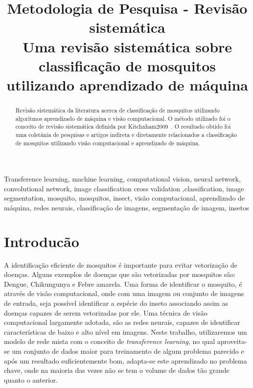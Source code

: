 \documentclass[conference]{IEEEtran}
\begin{document}
\title{Metodologia de Pesquisa - Revisão sistemática\\
{\footnotesize Uma revisão sistemática sobre classificação de mosquitos utilizando aprendizado de máquina}
}

\author{
}

\maketitle

\begin{abstract}
Revisão sistemática da literatura acerca de classificação de mosquitos utilizando algoritmos aprendizado de máquina e visão computacional.
O método utilizado foi o conceito de revisão sistemática definida por Kitchnham2009~\cite{Kitchenham2009}.
O resultado obtido foi uma coletânia de pesquisas e artigos indireta e diretamente relacionados a classificação de mosquitos utilizando visão computacional e aprendizado de máquina.
\end{abstract}

\begin{IEEEkeywords}
Transference learning, machine learning, computational vision,  neural network, convolutional network, image classification cross validation ,classification, image segmentation, mosquito, mosquitos, insect, visão computacional, aprendizado de máquina, redes neurais, classificação de imagens, segmentação de imagem, insetos 
\end{IEEEkeywords}

\section{Introducão}
A identificação eficiente de mosquitos é importante para evitar vetorização de doenças. Alguns exemplos de doenças que são vetorizadas por mosquitos são: Dengue, Chikungunya e Febre amarela.
%
Uma forma de identificar o mosquito, é através de visão computacional, onde com uma imagem ou conjunto de imagens de entrada, seja possível identificar a espécie do inseto associando assim as doenças capazes de serem vetorizadas por ele.
%
Uma técnica de visão computacional largamente adotada, são as redes neurais, capazes de identificar características de baixo e alto nível em imagens. Neste trabalho, utilizaremos um modelo de rede mista com o conceito de \emph{transference learning}, no qual aproveita-se um conjunto de dados maior para treinamento de algum problema parecido e após um resultado suficientemente bom, adapta-se este aprendizado no problema chave, onde na maioria das vezes não se tem o volume de dados tão grande quanto o anterior.
\end{document}
